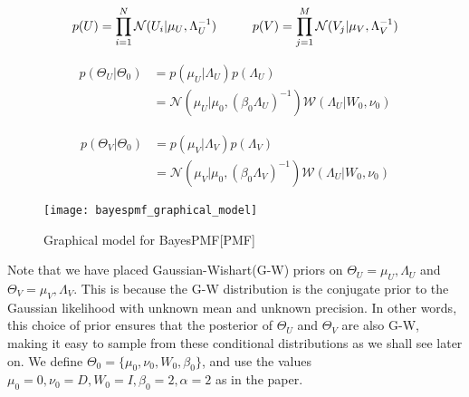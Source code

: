 \documentclass{article}
\theoremstyle{plain}
\begin{document}
\begin{equation}
p(U)=\prod_{i=1}^N \mathcal{N}(U_i|\mu_U,\Lambda_U^{-1}) \hspace{10 mm} p(V)=\prod_{j=1}^M \mathcal{N}(V_j|\mu_V,\Lambda_V^{-1})
\end{equation}

\begin{equation}
\begin{split}
p(\Theta_U|\Theta_0) 
& = p(\mu_U|\Lambda_U)p(\Lambda_U) \\
& =\mathcal{N}(\mu_U|\mu_0,(\beta_0 \Lambda_U)^{-1})\mathcal{W}(\Lambda_U|W_0,\nu_0)
\end{split}
\end{equation}

\begin{equation}
\begin{split}
p(\Theta_V|\Theta_0) 
& = p(\mu_V|\Lambda_V)p(\Lambda_V) \\
& =\mathcal{N}(\mu_V|\mu_0,(\beta_0 \Lambda_V)^{-1})\mathcal{W}(\Lambda_U|W_0,\nu_0)
\end{split}
\end{equation}

\begin{figure}[h]
\begin{center}
\centerline{\texttt{[image: bayespmf\_graphical\_model]}}
\end{center}
\caption{Graphical model for BayesPMF[PMF]}
\end{figure}

Note that we have placed Gaussian-Wishart(G-W) priors on $\Theta_U={\mu_U,\Lambda_U}$ and $\Theta_V={\mu_V,\Lambda_V}$. This is because the G-W distribution is the conjugate prior to the Gaussian likelihood with unknown mean and unknown precision. In other words, this choice of prior ensures that the posterior of $\Theta_U$ and $\Theta_V$ are also G-W, making it easy to sample from these conditional distributions as we shall see later on.
We define  $\Theta_0=\{\mu_0,\nu_0,W_0,\beta_0\}$, and use the values $\mu_0=0,\nu_0=D,W_0=I,\beta_0=2,\alpha=2$ as in the paper.
\end{document}
